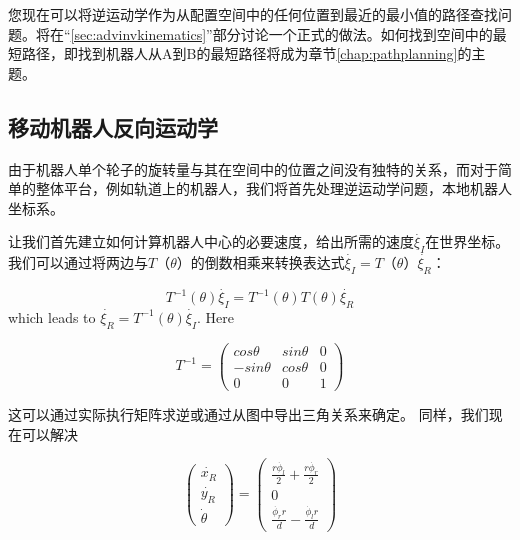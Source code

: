 您现在可以将逆运动学作为从配置空间中的任何位置到最近的最小值的路径查找问题。将在“\ref{sec:advinvkinematics}”部分讨论一个正式的做法。如何找到空间中的最短路径，即找到机器人从A到B的最短路径将成为章节\ref {chap:pathplanning}的主题。

\subsection {移动机器人反向运动学} \label{sec:ivkmobile}
由于机器人单个轮子的旋转量与其在空间中的位置之间没有独特的关系，而对于简单的整体平台，例如轨道上的机器人，我们将首先处理逆运动学问题，本地机器人坐标系。

让我们首先建立如何计算机器人中心的必要速度，给出所需的速度$ \dot {\xi_I} $在世界坐标。我们可以通过将两边与$ T（\theta）$的倒数相乘来转换表达式$ \dot {\xi_I} = T（\theta）\dot {\xi_R} $：

\begin{equation}\label{eq:mbik}
T^{-1}(\theta)\dot{\xi_I}=T^{-1}(\theta)T(\theta)\dot{\xi_R}
\end{equation}
which leads to $ \dot{\xi_R}=T^{-1}(\theta)\dot{\xi_I}$. Here

\begin{equation}
T^{-1}=\left(\begin{array}{ccc}cos \theta & sin \theta & 0 \\-sin \theta & cos \theta & 0 \\0 & 0 & 1\end{array}\right)
\end{equation}


这可以通过实际执行矩阵求逆或通过从图中导出三角关系来确定。 同样，我们现在可以解决

\begin{equation}
\left(\begin{array}{c} \dot{x_R}\\\dot{y_R}\\\dot{\theta}\end{array}\right)=\left(\begin{array}{c}\frac{r\dot{\phi_l}}{2}+\frac{r\dot{\phi_r}}{2}\\0\\\frac{\dot{\phi_r} r}{d}-\frac{\dot{\phi_l} r}{d}\end{array}\right)
\end{equation}

